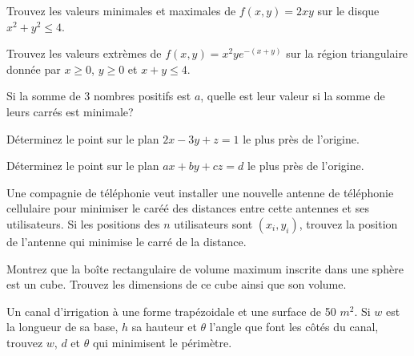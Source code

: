 \documentclass[]{book}
\theoremstyle{definition}
\theoremstyle{definition}
\theoremstyle{definition}
\theoremstyle{remark}
\let\BeginKnitrBlock\begin \let\EndKnitrBlock\end
\begin{document}
\BeginKnitrBlock{example}
\protect\hypertarget{exm:unnamed-chunk-227}{}{\label{exm:unnamed-chunk-227}
}Trouvez les valeurs minimales et maximales de \(f(x,y)=2xy\) sur le
disque \(x^2+y^2\leq 4\).
\EndKnitrBlock{example}
\vspace*{8cm}

\BeginKnitrBlock{example}
\protect\hypertarget{exm:unnamed-chunk-228}{}{\label{exm:unnamed-chunk-228}
}Trouvez les valeurs extrèmes de \(f(x,y)=x^2ye^{-(x+y)}\) sur la région
triangulaire donnée par \(x\geq 0\), \(y\geq 0\) et \(x+y \leq 4\).
\EndKnitrBlock{example}
\vspace*{8cm}

\BeginKnitrBlock{example}
\protect\hypertarget{exm:unnamed-chunk-229}{}{\label{exm:unnamed-chunk-229}
}Si la somme de 3 nombres positifs est \(a\), quelle est leur valeur si
la somme de leurs carrés est minimale?
\EndKnitrBlock{example}
\vspace*{8cm}

\BeginKnitrBlock{example}
\protect\hypertarget{exm:unnamed-chunk-230}{}{\label{exm:unnamed-chunk-230}
}Déterminez le point sur le plan \(2x-3y+z=1\) le plus près de
l'origine.
\EndKnitrBlock{example}
\vspace*{8cm}

\BeginKnitrBlock{example}
\protect\hypertarget{exm:unnamed-chunk-231}{}{\label{exm:unnamed-chunk-231}
}Déterminez le point sur le plan \(ax+by+cz=d\) le plus près de
l'origine.
\EndKnitrBlock{example}
\vspace*{8cm}

\BeginKnitrBlock{example}
\protect\hypertarget{exm:unnamed-chunk-232}{}{\label{exm:unnamed-chunk-232}
}Une compagnie de téléphonie veut installer une nouvelle antenne de
téléphonie cellulaire pour minimiser le caréé des distances entre cette
antennes et ses utilisateurs. Si les positions des \(n\) utilisateurs
sont \((x_i,y_i)\), trouvez la position de l'antenne qui minimise le
carré de la distance.
\EndKnitrBlock{example}
\vspace*{8cm}

\BeginKnitrBlock{example}
\protect\hypertarget{exm:unnamed-chunk-233}{}{\label{exm:unnamed-chunk-233}
}Montrez que la boîte rectangulaire de volume maximum inscrite dans une
sphère est un cube. Trouvez les dimensions de ce cube ainsi que son
volume.
\EndKnitrBlock{example}
\vspace*{8cm}

\BeginKnitrBlock{example}
\protect\hypertarget{exm:unnamed-chunk-234}{}{\label{exm:unnamed-chunk-234}
}Un canal d'irrigation à une forme trapézoidale et une surface de 50
\(m^2\). Si \(w\) est la longueur de sa base, \(h\) sa hauteur et
\(\theta\) l'angle que font les côtés du canal, trouvez \(w\), \(d\) et
\(\theta\) qui minimisent le périmètre.
\EndKnitrBlock{example}
\vspace*{8cm}
\end{document}
